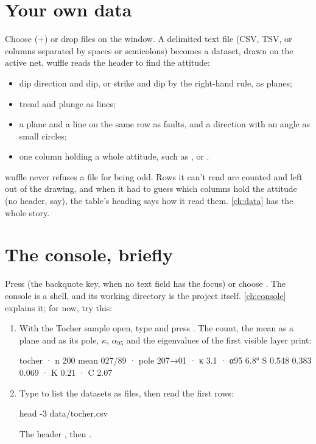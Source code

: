 \section{Your own data}

Choose  (+) or drop files on
the window. A delimited text file (CSV, TSV, or columns separated by spaces or semicolons) becomes a
dataset, drawn on the active net. wuffle reads the header to find the attitude:

\begin{itemize}
\item dip direction and dip, or strike and dip by the right-hand rule, as planes;
\item trend and plunge as lines;
\item a plane and a line on the same row as faults, and a direction with an angle as small circles;
\item one column holding a whole attitude, such as ,  or .
\end{itemize}

wuffle never refuses a file for being odd. Rows it can't read are counted and left out of the drawing,
and when it had to guess which columns hold the attitude (no header, say), the table's heading says
how it read them. \cref{ch:data} has the whole story.

\section{The console, briefly}

Press  (the backquote key, when no text field has the focus) or choose . The
console is a shell, and its working directory is the project itself. \cref{ch:console} explains it; for
now, try this:

\begin{tryit}
\begin{enumerate}
\item With the Tocher sample open, type  and press . The count, the mean as a plane
and as its pole, $\kappa$, $\alpha_{95}$ and the eigenvalues of the first visible layer print:
\begin{codeblock}
tocher · n 200
mean 027/89 · pole 207→01 · κ 3.1 · α95 6.8°
S 0.548 0.383 0.069 · K 0.21 · C 2.07
\end{codeblock}
\item Type  to list the datasets as files, then read the first rows:
\begin{codeblock}
head -3 data/tocher.csv
\end{codeblock}
The header , then .
\end{enumerate}
\end{tryit}
